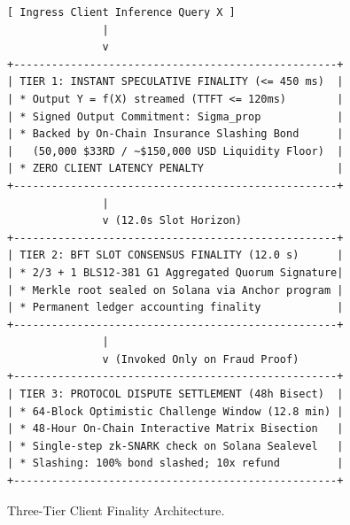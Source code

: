 \documentclass[10pt,twocolumn,letterpaper]{article}
\begin{document}
\begin{figure}[htbp]
\centering
\begin{verbatim}
[ Ingress Client Inference Query X ]
               |
               v
+---------------------------------------------------+
| TIER 1: INSTANT SPECULATIVE FINALITY (<= 450 ms)  |
| * Output Y = f(X) streamed (TTFT <= 120ms)        |
| * Signed Output Commitment: Sigma_prop            |
| * Backed by On-Chain Insurance Slashing Bond      |
|   (50,000 $33RD / ~$150,000 USD Liquidity Floor)  |
| * ZERO CLIENT LATENCY PENALTY                     |
+---------------------------------------------------+
               |
               v (12.0s Slot Horizon)
+---------------------------------------------------+
| TIER 2: BFT SLOT CONSENSUS FINALITY (12.0 s)      |
| * 2/3 + 1 BLS12-381 G1 Aggregated Quorum Signature|
| * Merkle root sealed on Solana via Anchor program |
| * Permanent ledger accounting finality            |
+---------------------------------------------------+
               |
               v (Invoked Only on Fraud Proof)
+---------------------------------------------------+
| TIER 3: PROTOCOL DISPUTE SETTLEMENT (48h Bisect)  |
| * 64-Block Optimistic Challenge Window (12.8 min) |
| * 48-Hour On-Chain Interactive Matrix Bisection   |
| * Single-step zk-SNARK check on Solana Sealevel   |
| * Slashing: 100% bond slashed; 10x refund         |
+---------------------------------------------------+
\end{verbatim}
\caption{Three-Tier Client Finality Architecture.}
\label{fig:finality}
\end{figure}
\end{document}
